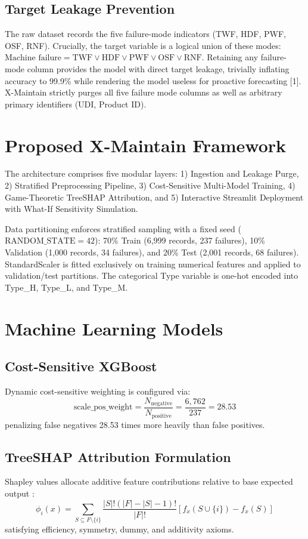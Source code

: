 \documentclass[journal,10pt,twocolumn]{IEEEtran}
\begin{document}
\subsection{Target Leakage Prevention}
The raw dataset records the five failure-mode indicators (TWF, HDF, PWF, OSF, RNF). Crucially, the target variable is a logical union of these modes: $\text{Machine failure} = \text{TWF} \lor \text{HDF} \lor \text{PWF} \lor \text{OSF} \lor \text{RNF}$. Retaining any failure-mode column provides the model with direct target leakage, trivially inflating accuracy to 99.9\% while rendering the model useless for proactive forecasting [1]. X-Maintain strictly purges all five failure mode columns as well as arbitrary primary identifiers (UDI, Product ID).

\section{Proposed X-Maintain Framework}
The architecture comprises five modular layers: 1) Ingestion and Leakage Purge, 2) Stratified Preprocessing Pipeline, 3) Cost-Sensitive Multi-Model Training, 4) Game-Theoretic TreeSHAP Attribution, and 5) Interactive Streamlit Deployment with What-If Sensitivity Simulation.

Data partitioning enforces stratified sampling with a fixed seed ($\text{RANDOM\_STATE} = 42$): 70\% Train (6,999 records, 237 failures), 10\% Validation (1,000 records, 34 failures), and 20\% Test (2,001 records, 68 failures). StandardScaler is fitted exclusively on training numerical features and applied to validation/test partitions. The categorical Type variable is one-hot encoded into Type\_H, Type\_L, and Type\_M.

\section{Machine Learning Models}
\subsection{Cost-Sensitive XGBoost}
Dynamic cost-sensitive weighting is configured via:
\begin{equation}
\text{scale\_pos\_weight} = \frac{N_{\text{negative}}}{N_{\text{positive}}} = \frac{6,762}{237} = 28.53
\end{equation}
penalizing false negatives 28.53 times more heavily than false positives.

\subsection{TreeSHAP Attribution Formulation}
Shapley values allocate additive feature contributions relative to base expected output \cite{lundberg2017}:
\begin{equation}
\phi_i(x) = \sum_{S \subseteq F \setminus \{i\}} \frac{|S|!(|F| - |S| - 1)!}{|F|!} \left[ f_x(S \cup \{i\}) - f_x(S) \right]
\end{equation}
satisfying efficiency, symmetry, dummy, and additivity axioms.
\end{document}
